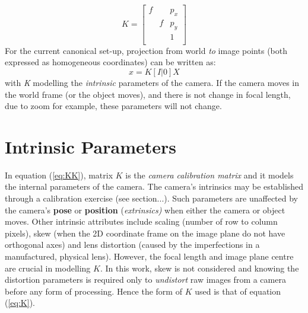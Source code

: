 \documentclass[12pt]{article}
\begin{document}
\begin{equation} \label{eq:K}
K = \left[ {\begin{array}{ccc}
f & & p_x \\
& f & p_y \\
& & 1 \\
\end{array} }\right] 
\end{equation}
For the current canonical set-up, projection from world \textit{to} image points (both expressed as homogeneous coordinates) can be written as:  
\begin{equation}
\label{eq:KK}
x = K[I | 0]X
\end{equation}
with \textit{K} modelling the \textit{intrinsic} parameters of the camera. If the camera moves in the world frame (or the object moves), and there is not change in focal length, due to zoom for example, these parameters will not change.

\section*{Intrinsic Parameters}
In equation (\ref{eq:KK}), matrix $K$ is the \textit{camera calibration matrix} and it models the internal parameters of the camera. The camera's intrinsics may be established through a calibration exercise (see section...). Such parameters are unaffected by the camera's \textbf{pose} or \textbf{position} (\textit{extrinsics)} when either the camera or object moves.  Other intrinsic attributes include scaling (number of row to column pixels), skew (when the 2D coordinate frame on the image plane do not have orthogonal axes) and lens distortion (caused by the imperfections in a manufactured, physical lens). However, the focal length and image plane centre are crucial in modelling $K$. In this work, skew is not considered and knowing the distortion parameters is required only to \textit{undistort} raw images from a camera before any form of processing. 
Hence the form of $K$ used is that of equation (\ref{eq:K}).
\end{document}

